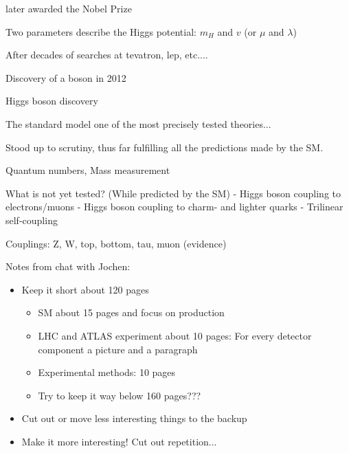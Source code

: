 later awarded the Nobel Prize


Two parameters describe the Higgs potential: $m_{H}$ and $v$ (or $\mu$ and
$\lambda$)

After decades of searches at tevatron, lep, etc....

Discovery of a boson \cite{HIGG-2012-27,CMS-HIG-12-028} in 2012

Higgs boson discovery



The standard model one of the most precisely tested theories...

Stood up to scrutiny, thus far fulfilling all the predictions made by the SM.

Quantum numbers, Mass measurement

What is not yet tested? (While predicted by the SM)
- Higgs boson coupling to electrons/muons
- Higgs boson coupling to charm- and lighter quarks
- Trilinear self-coupling


Couplings: Z, W, top, bottom, tau, muon (evidence)

\clearpage



Notes from chat with Jochen:
\begin{itemize}

\item Keep it short \ra about 120 pages
  \begin{itemize}
  \item SM about 15 pages and focus on \HH production

  \item LHC and ATLAS experiment about 10 pages: For every detector
    component a picture and a paragraph

  \item Experimental methods: 10 pages

  \item Try to keep it way below 160 pages???
  \end{itemize}

\item Cut out or move less interesting things to the backup

\item Make it more interesting! Cut out repetition...

\end{itemize}


